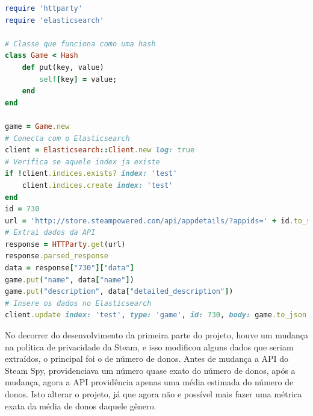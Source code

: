 \begin{lstlisting}[language={Ruby}, caption = {Código do Plugin}, label = {code:plugin}]
require 'httparty'
require 'elasticsearch'

# Classe que funciona como uma hash
class Game < Hash
	def put(key, value)
		self[key] = value;
	end
end

game = Game.new
# Conecta com o Elasticsearch
client = Elasticsearch::Client.new log: true
# Verifica se aquele index ja existe
if !client.indices.exists? index: 'test'
	client.indices.create index: 'test'
end
id = 730
url = 'http://store.steampowered.com/api/appdetails/?appids=' + id.to_s
# Extrai dados da API
response = HTTParty.get(url)
response.parsed_response
data = response["730"]["data"]
game.put("name", data["name"])
game.put("description", data["detailed_description"])
# Insere os dados no Elasticsearch
client.update index: 'test', type: 'game', id: 730, body: game.to_json
\end{lstlisting}
No decorrer do desenvolvimento da primeira parte do projeto, houve um mudança na política de privacidade da Steam, e isso modificou alguns dados que seriam extraídos, o principal foi o de número de donos. Antes de mudança a API do Steam Spy, providenciava um número quase exato do número de donos, após a mudança, agora a API providência apenas uma média estimada do número de donos. Isto alterar o projeto, já que agora não e possível mais fazer uma métrica exata da média de donos daquele gênero.